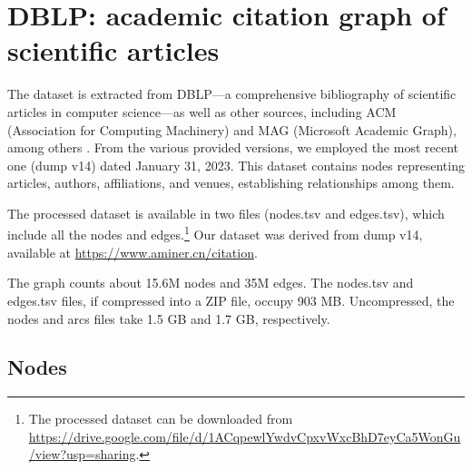 \section{DBLP: academic citation graph of scientific articles}
\label{sec:dblp}

The dataset is extracted from DBLP—a comprehensive bibliography of scientific articles in computer science—as well as other sources, including ACM (Association for Computing Machinery) and MAG (Microsoft Academic Graph), among others \cite{dblpsource}. From the various provided versions, we employed the most recent one (dump v14) dated January 31, 2023. This dataset contains nodes representing articles, authors, affiliations, and venues, establishing relationships among them.

The processed dataset is available in two files (nodes.tsv and edges.tsv), which include all the nodes and edges.\footnote{The processed dataset can be downloaded from \url{https://drive.google.com/file/d/1ACqpewlYwdvCpxvWxcBhD7eyCa5WonGu/view?usp=sharing}.}
Our dataset was derived from dump v14, available at \url{https://www.aminer.cn/citation}.

The graph counts about 15.6M nodes and 35M edges. The nodes.tsv and edges.tsv files, if compressed into a ZIP file, occupy 903 MB. Uncompressed, the nodes and arcs files take 1.5 GB and 1.7 GB, respectively.

\subsection*{Nodes}

